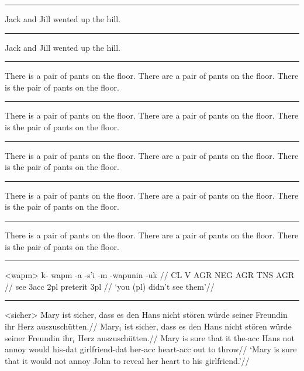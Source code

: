 \filbreak\hrule\medskip

\begingroup
\ex *Jack and Jill wented up the hill.\xe
\endgroup
\bigskip

\filbreak\hrule\medskip

\begingroup
\ex \judge* Jack and Jill wented up the hill.\xe
\endgroup
\bigskip

\filbreak\hrule\medskip

\begingroup
\pex
\a There is a pair of pants on the floor.
\a {}There are a pair of pants on the floor.
\a \judge*There is the pair of pants on the floor.
\xe
\endgroup
\bigskip

\filbreak\hrule\medskip

\begingroup
\pex
\a There is a pair of pants on the floor.
\a {}There are a pair of pants on the floor.
\a \ljudge*There is the pair of pants on the floor.
\xe
\endgroup
\bigskip

\filbreak\hrule\medskip

\begingroup
\pex[*=?*]
\a There is a pair of pants on the floor.
\a {}There are a pair of pants on the floor.
\a \ljudge*There is the pair of pants on the floor.
\xe
\endgroup
\bigskip

\filbreak\hrule\medskip

\begingroup
\pex[*]
\a There is a pair of pants on the floor.
\a \ljudge* There are a pair of pants on the floor.
\a \ljudge* There is the pair of pants on the floor.
\xe
\endgroup
\bigskip

\filbreak\hrule\medskip

\begingroup
\pex[*=?*,textoffset=!-.3em]
\a There is a pair of pants on the floor.
\a {} There are a pair of pants on the floor.
\a \ljudge* There is the pair of pants on the floor.
\xe
\endgroup
\bigskip

\filbreak\hrule\medskip

\begingroup
 \ex<wapm>
\begingl
\gla k- wapm -a -s'i -m -wapunin -uk //
\glb CL V AGR NEG AGR TNS AGR //
 see {\sc 3acc} {} {\sc 2pl} preterit {\sc 3pl} //
\glft `you (pl) didn't see them'//
\endgl
\xe
\endgroup
\bigskip

\filbreak\hrule\medskip

\begingroup
\ex<sicher>
\begingl
\glpreamble Mary ist sicher, dass es den Hans nicht st\"oren w\"urde
seiner Freundin ihr Herz auszusch\"utten.//
\gla Mary$_i$ ist sicher, dass es den Hans nicht st\"oren w\"urde
seiner Freundin ihr$_i$ Herz auszusch\"utten.//
\glb Mary is sure that it the-{\sc acc} Hans not annoy would
his-{\sc dat} girlfriend-{\sc dat} her-{\sc acc} heart-{\sc acc} {out to
throw}//
\glft  `Mary is sure that it would not annoy John to reveal her
heart to his girlfriend.'//
\endgl
\xe
\endgroup
\bigskip

